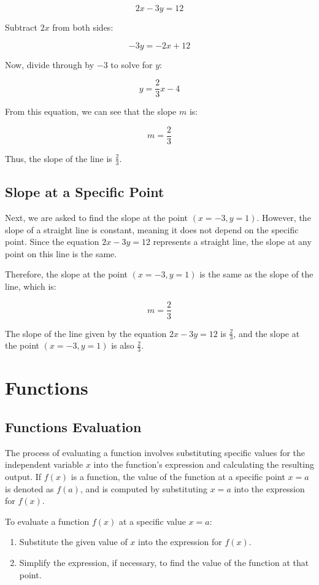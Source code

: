 \[
2x - 3y = 12
\]

Subtract \( 2x \) from both sides:

\[
-3y = -2x + 12
\]

Now, divide through by \( -3 \) to solve for \( y \):

\[
y = \frac{2}{3}x - 4
\]

From this equation, we can see that the slope \( m \) is:

\[
m = \frac{2}{3}
\]

Thus, the slope of the line is \( \frac{2}{3} \).


\subsection*{Slope at a Specific Point}

Next, we are asked to find the slope at the point \( (x = -3, y = 1) \). However, the slope of a straight line is constant, meaning it does not depend on the specific point. Since the equation \( 2x - 3y = 12 \) represents a straight line, the slope at any point on this line is the same.

Therefore, the slope at the point \( (x = -3, y = 1) \) is the same as the slope of the line, which is:

\[
m = \frac{2}{3}
\]


The slope of the line given by the equation \( 2x - 3y = 12 \) is \( \frac{2}{3} \), and the slope at the point \( (x = -3, y = 1) \) is also \( \frac{2}{3} \).

\section{Functions}

\subsection{Functions Evaluation}

The process of evaluating a function involves substituting specific values for the independent variable \( x \) into the function's expression and calculating the resulting output. If \( f(x) \) is a function, the value of the function at a specific point \( x = a \) is denoted as \( f(a) \), and is computed by substituting \( x = a \) into the expression for \( f(x) \).

To evaluate a function \( f(x) \) at a specific value \( x = a \):
\begin{enumerate}
    \item Substitute the given value of \( x \) into the expression for \( f(x) \).
    \item Simplify the expression, if necessary, to find the value of the function at that point.
\end{enumerate}

